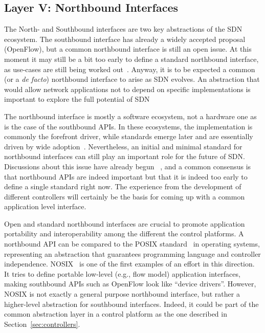 \subsection{Layer V: Northbound Interfaces}
\label{sec:layer-north}

The North- and Southbound interfaces are two key abstractions of the SDN ecosystem. 
The southbound interface has already a widely accepted proposal (OpenFlow), but a common northbound 
interface is still an open issue.
At this moment it may still be a bit too early to define a standard northbound interface, as use-cases are still being worked out~\cite{dix2013}.
Anyway, it is to be expected a common (or a \emph{de facto}) northbound interface to arise as SDN evolves.
An abstraction that would allow network applications not to depend on specific implementations is important to explore the full potential of SDN 

The northbound interface is mostly a software ecosystem, not a hardware one as is the case of the southbound APIs.
In these ecosystems, the implementation is commonly the forefront driver, while standards emerge later and 
are essentially driven by wide adoption~\cite{guis2012}. Nevertheless, an initial and 
minimal standard for northbound interfaces can still play an important role for the future of SDN. 
Discussions about this issue have already begun ~\cite{dix2013,guis2012,salisbury2012-1,ferro2012,casemore2012,pepelnjak2012,johnson2012,little2013-1}, and a common consensus is that northbound APIs are indeed important but that it is indeed too early to define a single standard right now.
The experience from the development of different controllers will certainly be the basis for coming up with a common application level interface.

Open and standard northbound interfaces are crucial to promote application portability and interoperability among the different the control platforms.
A northbound API can be compared to the POSIX standard~\cite{posixieee} in operating systems, representing an abstraction that guarantees programming language and controller independence.
NOSIX~\cite{wundsam2012} is one of the first examples of an effort in this direction. It tries to 
define portable low-level (e.g., flow model) application interfaces, making southbound APIs such as OpenFlow 
look like ``device drivers''. However, NOSIX is not exactly a general purpose northbound interface, but 
rather a higher-level abstraction for southbound interfaces. Indeed, it could be part of the common 
abstraction layer in a control platform as the one described in Section~\ref{sec:controllers}.

